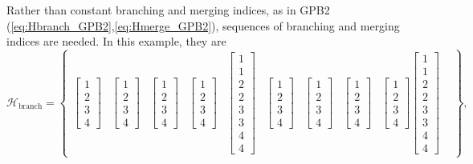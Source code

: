 Rather than constant branching and merging indices, as in GPB2 (\ref{eq:Hbranch_GPB2},\ref{eq:Hmerge_GPB2}), sequences of branching and merging indices are needed. In this example, they are
\begin{equation} \label{eq:Hbranch_SFex2}
	\mathcal{H}_{\text{branch}} = \begin{Bmatrix}
		\begin{bmatrix} 1 \\ 2 \\ 3 \\ 4 \end{bmatrix} &
		\begin{bmatrix} 1 \\ 2 \\ 3 \\ 4 \end{bmatrix} &
		\begin{bmatrix} 1 \\ 2 \\ 3 \\ 4 \end{bmatrix} &
		\begin{bmatrix} 1 \\ 2 \\ 3 \\ 4 \end{bmatrix} &
		\begin{bmatrix} 1 \\ 1 \\ 2 \\ 2 \\ 3 \\ 3 \\ 4 \\ 4 \end{bmatrix} &
		\begin{bmatrix} 1 \\ 2 \\ 3 \\ 4 \end{bmatrix} &
		\begin{bmatrix} 1 \\ 2 \\ 3 \\ 4 \end{bmatrix} &
		\begin{bmatrix} 1 \\ 2 \\ 3 \\ 4 \end{bmatrix} &
		\begin{bmatrix} 1 \\ 2 \\ 3 \\ 4 \end{bmatrix}
		\begin{bmatrix} 1 \\ 1 \\ 2 \\ 2 \\ 3 \\ 3 \\ 4 \\ 4 \end{bmatrix} &
	\end{Bmatrix},
\end{equation}
